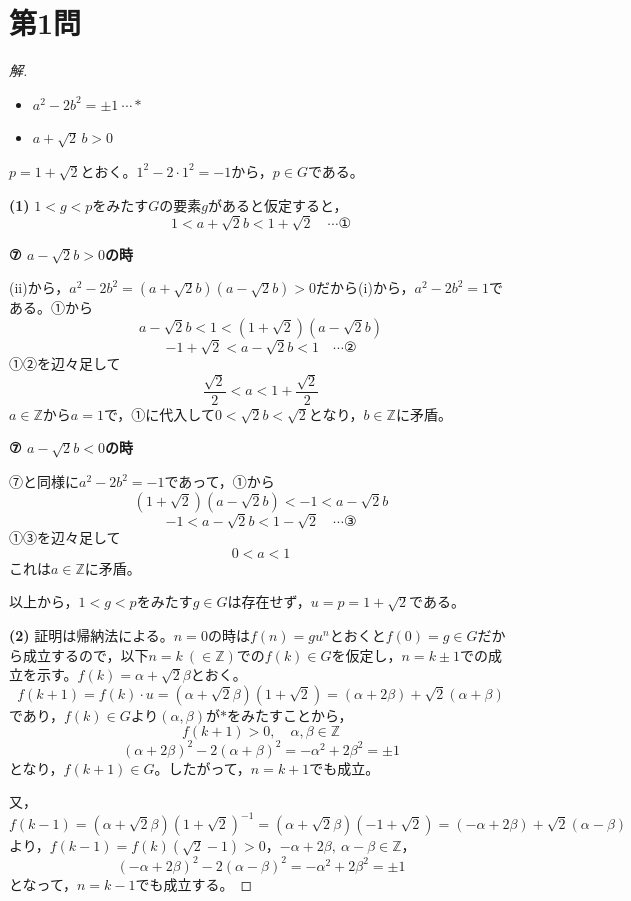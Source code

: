 \documentclass[../main.tex]{subfiles}
\begin{document}
\section*{第1問}

\begin{proof}[解]
  \begin{itemize}
    \item[(i)] $a^2-2b^2=\pm1\ \cdots *$
    \item[(ii)] $a+\sqrt2\,b>0$
  \end{itemize}
  $p=1+\sqrt2$とおく。$1^2-2\cdot1^2=-1$から，$p\in G$である。

  \textbf{(1)} $1<g<p$をみたす$G$の要素$g$があると仮定すると，
  \[
    1<a+\sqrt2b<1+\sqrt2 \quad\cdots\text{①}
  \]

  \textbf{⑦ $a-\sqrt2b>0$の時}

  (ii)から，$a^2-2b^2=(a+\sqrt2b)(a-\sqrt2b)>0$だから(i)から，$a^2-2b^2=1$である。①から
  \[
    a-\sqrt2b<1<(1+\sqrt2)(a-\sqrt2b)
  \]
  \[
    -1+\sqrt2<a-\sqrt2b<1 \quad\cdots\text{②}
  \]
  ①②を辺々足して
  \[
    \frac{\sqrt2}{2}<a<1+\frac{\sqrt2}{2}
  \]
  $a\in\mathbb{Z}$から$a=1$で，①に代入して$0<\sqrt2b<\sqrt2$となり，$b\in\mathbb{Z}$に矛盾。

  \textbf{⑦ $a-\sqrt2b<0$の時}

  ⑦と同様に$a^2-2b^2=-1$であって，①から
  \[
    (1+\sqrt2)(a-\sqrt2b)<-1<a-\sqrt2b
  \]
  \[
    -1<a-\sqrt2b<1-\sqrt2 \quad\cdots\text{③}
  \]
  ①③を辺々足して
  \[
    0<a<1
  \]
  これは$a\in\mathbb{Z}$に矛盾。

  以上から，$1<g<p$をみたす$g\in G$は存在せず，$u=p=1+\sqrt2$である。

  \textbf{(2)} 証明は帰納法による。$n=0$の時は$f(n)=gu^n$とおくと$f(0)=g\in G$だから成立するので，以下$n=k\ (\in\mathbb{Z})$での$f(k)\in G$を仮定し，$n=k\pm1$での成立を示す。$f(k)=\alpha+\sqrt2\beta$とおく。
  \[
    f(k+1)=f(k)\cdot u=(\alpha+\sqrt2\beta)(1+\sqrt2)=(\alpha+2\beta)+\sqrt2(\alpha+\beta)
  \]
  であり，$f(k)\in G$より$(\alpha,\beta)$が$*$をみたすことから，
  \[
    f(k+1)>0,\quad \alpha,\beta\in\mathbb{Z}
  \]
  \[
    (\alpha+2\beta)^2-2(\alpha+\beta)^2=-\alpha^2+2\beta^2=\pm1
  \]
  となり，$f(k+1)\in G$。したがって，$n=k+1$でも成立。

  又，
  \[
    f(k-1)=(\alpha+\sqrt2\beta)(1+\sqrt2)^{-1}=(\alpha+\sqrt2\beta)(-1+\sqrt2)=(-\alpha+2\beta)+\sqrt2(\alpha-\beta)
  \]
  より，$f(k-1)=f(k)(\sqrt2-1)>0$，$-\alpha+2\beta,\ \alpha-\beta\in\mathbb{Z}$，
  \[
    (-\alpha+2\beta)^2-2(\alpha-\beta)^2=-\alpha^2+2\beta^2=\pm1
  \]
  となって，$n=k-1$でも成立する。


\end{proof}
\end{document}

